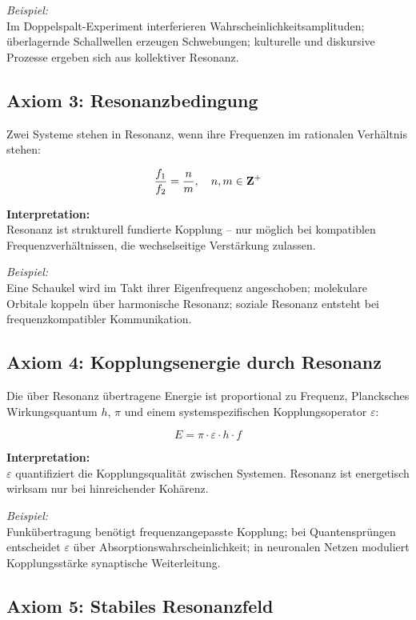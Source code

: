 \documentclass[12pt]{iopart}
\providecommand{\mathbb}[1]{\mathbf{#1}}
\providecommand{\quad}{\hskip1em\relax}
\begin{document}
\textit{Beispiel:}\\
Im Doppelspalt-Experiment interferieren Wahrscheinlichkeitsamplituden; überlagernde Schallwellen erzeugen Schwebungen; kulturelle und diskursive Prozesse ergeben sich aus kollektiver Resonanz.

\subsection{Axiom 3: Resonanzbedingung}

Zwei Systeme stehen in Resonanz, wenn ihre Frequenzen im rationalen Verhältnis stehen:

$$
\frac{f_1}{f_2} = \frac{n}{m},\quad n, m \in \mathbb{Z}^+
$$

\textbf{Interpretation:}\\
Resonanz ist strukturell fundierte Kopplung – nur möglich bei kompatiblen Frequenzverhältnissen, die wechselseitige Verstärkung zulassen.

\textit{Beispiel:}\\
Eine Schaukel wird im Takt ihrer Eigenfrequenz angeschoben; molekulare Orbitale koppeln über harmonische Resonanz; soziale Resonanz entsteht bei frequenzkompatibler Kommunikation.

\subsection{Axiom 4: Kopplungsenergie durch Resonanz}

Die über Resonanz übertragene Energie ist proportional zu Frequenz, Plancksches Wirkungsquantum $h$, $\pi$ und einem systemspezifischen Kopplungsoperator $\varepsilon$:

$$
E = \pi \cdot \varepsilon \cdot h \cdot f
$$

\textbf{Interpretation:}\\
$\varepsilon$ quantifiziert die Kopplungsqualität zwischen Systemen. Resonanz ist energetisch wirksam nur bei hinreichender Kohärenz.

\textit{Beispiel:}\\
Funkübertragung benötigt frequenzangepasste Kopplung; bei Quantensprüngen entscheidet $\varepsilon$ über Absorptionswahrscheinlichkeit; in neuronalen Netzen moduliert Kopplungsstärke synaptische Weiterleitung.

\subsection{Axiom 5: Stabiles Resonanzfeld}
\end{document}
